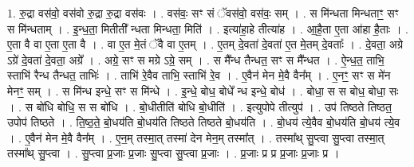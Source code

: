 \documentclass[17pt]{extarticle}
\begin{document}
1. रु॒द्रा वस॑वो॒ वस॑वो रु॒द्रा रु॒द्रा वस॑वः । . वस॑वः॒ सꣳ सं ॅवस॑वो॒ वस॑वः॒ सम् । . स मि॑न्धता मिन्धताꣳ॒॒ सꣳ स मि॑न्धताम् । . इ॒न्ध॒ता॒ मितीती᳚ न्धता मिन्धता॒ मिति॑ । . इत्या॑हा॒हे तीत्या॑ह । . आ॒है॒ता ए॒ता आ॑हा है॒ताः । . ए॒ता वै वा ए॒ता ए॒ता वै । . वा ए॒त मे॒तं ॅवै वा ए॒तम् । . ए॒तम् दे॒वता॑ दे॒वता॑ ए॒त मे॒तम् दे॒वताः᳚ । . दे॒वता॒ अग्रे ऽग्रे॑ दे॒वता॑ दे॒वता॒ अग्रे᳚ । . अग्रे॒ सꣳ स मग्रे ऽग्रे॒ सम् । . स मै᳚न्ध तैन्धत॒ सꣳ स मै᳚न्धत । . ऐ॒न्ध॒त॒ ताभि॒ स्ताभि॑ रैन्ध तैन्धत॒ ताभिः॑ । . ताभि॑ रे॒वैव ताभि॒ स्ताभि॑ रे॒व । . ए॒वैन॑ मेन मे॒वै वैन᳚म् । . ए॒नꣳ॒॒ सꣳ स मे॑न मेनꣳ॒॒ सम् । . स मि॑न्ध इन्धे॒ सꣳ स मि॑न्धे । . इ॒न्धे॒ बोध॒ बोधे᳚ न्ध इन्धे॒ बोध॑ । . बोधा॒ स स बोध॒ बोधा॒ सः । . स बो॑धि बोधि॒ स स बो॑धि । . बो॒धीतीति॑ बोधि बो॒धीति॑ । . इत्युपोपे तीत्युप॑ । . उप॑ तिष्ठते तिष्ठत॒ उपोप॑ तिष्ठते । . ति॒ष्ठ॒ते॒ बो॒धय॑ति बो॒धय॑ति तिष्ठते तिष्ठते बो॒धय॑ति । . बो॒धय॑ त्ये॒वैव बो॒धय॑ति बो॒धय॑ त्ये॒व । . ए॒वैन॑ मेन मे॒वै वैन᳚म् । . ए॒न॒म् तस्मा॒त् तस्मा॑ देन मेन॒म् तस्मा᳚त् । . तस्मा᳚थ् सु॒प्त्वा सु॒प्त्वा तस्मा॒त् तस्मा᳚थ् सु॒प्त्वा । . सु॒प्त्वा प्र॒जाः प्र॒जाः सु॒प्त्वा सु॒प्त्वा प्र॒जाः । . प्र॒जाः प्र प्र प्र॒जाः प्र॒जाः प्र । \newline
\end{document}
